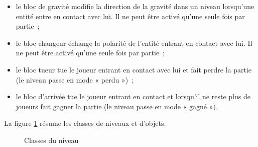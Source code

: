 \begin{itemize}
    \item le bloc de gravité modifie la direction de la gravité
    dans un niveau lorsqu'une entité entre en contact avec lui.
    Il ne peut être activé qu'une seule fois par partie~;

    \item le bloc changeur échange la polarité de l'entité
    entrant en contact avec lui. Il ne peut être activé qu'une seule
    fois par partie~;

    \item le bloc tueur tue le joueur entrant en contact avec lui
    et fait perdre la partie (le niveau passe en mode « perdu »)~;

    \item le bloc d'arrivée tue le joueur entrant en contact et lorsqu'il
    ne reste plus de joueurs fait gagner la partie (le niveau passe
    en mode « gagné »).
\end{itemize}

La figure \ref{fig:analyse-uml-level} résume les classes de niveaux
et d'objets.

\thispagestyle{empty}
\begin{figure}[p!]
    \centering
    
    \caption{Classes du niveau}
    \label{fig:analyse-uml-level}
\end{figure}
\restoregeometry
